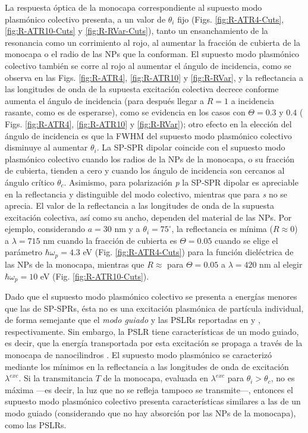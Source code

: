 La respuesta óptica de la monocapa correspondiente al supuesto modo plasmónico colectivo presenta, a un valor de $\theta_i$ fijo (Figs. \ref{fig:R-ATR4-Cuts}, \ref{fig:R-ATR10-Cuts} y \ref{fig:R-RVar-Cuts}), tanto un ensanchamiento de la resonancia como un corrimiento al rojo, al aumentar la fracción de cubierta de la monocapa o el radio de las NPs que la conforman. El supuesto modo plasmónico colectivo también se corre al rojo al aumentar el ángulo de incidencia, como se observa en las Figs. \ref{fig:R-ATR4}, \ref{fig:R-ATR10} y \ref{fig:R-RVar}, y la reflectancia a las longitudes de onda de la supuesta excitación colectiva decrece conforme aumenta el ángulo de incidencia (para después llegar a $R=1$ a incidencia rasante, como es de esperarse), como se evidencia en los casos con $\Theta=0.3$ y $0.4$ ( Figs. \ref{fig:R-ATR4}, \ref{fig:R-ATR10} y \ref{fig:R-RVar}); otro efecto en la elección del ángulo de incidencia es que la FWHM del supuesto modo plasmónico colectivo disminuye al aumentar $\theta_i$. La SP-SPR dipolar coincide con el supuesto modo plasmónico colectivo cuando los radios de la NPs de la monocapa, o su fracción de cubierta, tienden a cero y cuando los ángulo de incidencia son cercanos al ángulo crítico $\theta_c$. Asimismo, para polarización \emph{p} la SP-SPR dipolar es apreciable en la reflectancia y distinguible del modo colectivo, mientras que para \emph{s} no se aprecia. El valor de la reflectancia a las longitudes de onda de la supuesta excitación colectiva, así como su ancho, dependen del material de las NPs. Por ejemplo, considerando  $a=30$ nm y a $\theta_i=75^\circ$, la reflectancia es mínima ($R\approx 0$) a $\lambda=715$ nm cuando la fracción de cubierta es $\Theta=0.05$ cuando se elige el parámetro $\hbar\omega_p=4.3$ eV (Fig. \ref{fig:R-ATR4-Cuts}) para la función dieléctrica de las NPs de la monocapa, mientras que  $R\approx$ para $\Theta=0.05$ a  $\lambda=420$ nm al elegir $\hbar\omega_p=10$ eV (Fig. \ref{fig:R-ATR10-Cuts}).

 Dado que el supuesto modo plasmónico colectivo se presenta a energías menores que las de SP-SPRs, ésta no es una excitación plasmónica de partícula individual, de forma semejante que el \emph{modo guiado} y las PSLRs reportadas en  \cite{kabashin2009plasmonic} y \cite{danilov2018ultra}, respectivamente. Sin embargo, la PSLR tiene características de un modo guiado, es decir, que la energía transportada por esta excitación se propaga a través de la monocapa de nanocilindros \cite{kabashin2009plasmonic}. El supuesto modo plasmónico  se caracterizó mediante los mínimos en la reflectancia a las  longitudes de onda de excitación $\lambda^{exc}$. Si la transmitancia $T$ de la monocapa, evaluada en $\lambda^{exc}$ para $\theta_i>\theta_c$, no es máxima ---es decir, la luz que no se refleja tampoco se transmite---, entonces el supuesto modo plasmónico colectivo presenta características similares a las de un modo guiado (considerando que no hay absorción por las NPs de la monocapa), como las PSLRs.

